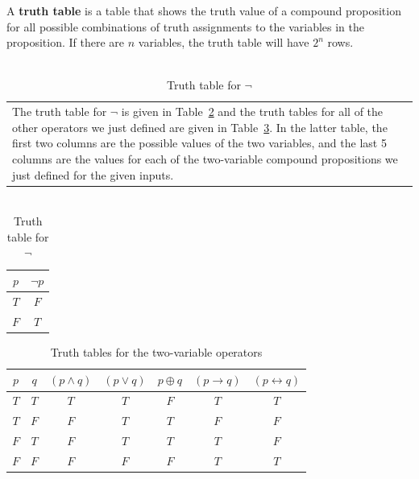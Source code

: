 \begin{df}
A {\bf truth table} is a table that shows the truth value of a 
compound proposition for all possible combinations of
truth assignments to the variables in the proposition. If there are $n$
variables, the truth table will have $2^n$ rows.
\end{df}

\begin{table}[h]
\begin{minipage}[t]{.7\textwidth}
\begin{tabular}[t]{p{\textwidth}}
The truth table for $\neg$ is given in Table~\ref{tab:not} and
the truth tables for all of the other operators we just defined are given in Table~\ref{tab:2vars}.
In the latter table, the first two columns are the possible values of the two variables, and the last 5 columns are
the values for each of the two-variable compound propositions we just defined for the given inputs.
\end{tabular}
\end{minipage}
\hfill
\begin{minipage}[t]{.2\textwidth}
\begin{tabular}[t]{|c|c|}
\hline $p$ & $\neg p$\\
\hline 
$T$ & $F$\\
$F$ & $T$\\
\hline
\end{tabular}
\footnotesize\caption{\\Truth table for $\neg$}\label{tab:not}
\end{minipage}
\end{table}

\begin{table}[h]
\centering
\begin{tabular}{|cc||c|c|c|c|c|}
\hline $p$ & $q$ & $(p \wedge q)$ & $(p \vee q)$ &
$p\oplus q$&
$(p  \rightarrow q)$ & $(p  \leftrightarrow q)$ \\
\hline 
$T$ & $T$& $T$ &$T$&$F$&$T$&$T$ \\
$T$ & $F$& $F$ &$T$&$T$&$F$&$F$ \\
$F$ & $T$& $F$ &$T$&$T$&$T$&$F$ \\
$F$ & $F$& $F$ &$F$&$F$&$T$&$T$ \\
\hline
\end{tabular}
\footnotesize\caption{Truth tables for the two-variable operators}\label{tab:2vars}
\end{table}

